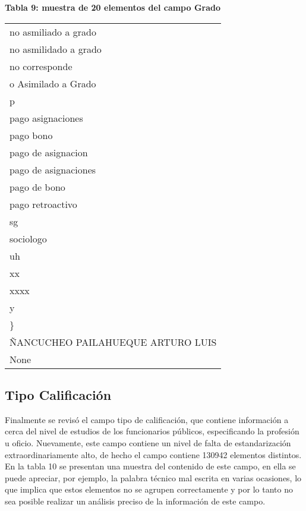 \documentclass[11pt]{article}
\begin{document}
    \textbf{Tabla 9: muestra de 20 elementos del campo Grado}

    
    \begin{tabular}{l}
\toprule
              no asmiliado a grado \\
             no asmilidado a grado \\
                    no corresponde \\
               o Asimilado a Grado \\
                                 p \\
                 pago asignaciones \\
                         pago bono \\
                pago de asignacion \\
              pago de asignaciones \\
                      pago de bono \\
                  pago retroactivo \\
                                sg \\
                         sociologo \\
                                uh \\
                                xx \\
                              xxxx \\
                                 y \\
                                 \} \\
 ÑANCUCHEO PAILAHUEQUE ARTURO LUIS \\
                              None \\
\bottomrule
\end{tabular}

    
    \hypertarget{tipo-calificaciuxf3n}{%
\subsection{Tipo Calificación}\label{tipo-calificaciuxf3n}}

    Finalmente se revisó el campo tipo de calificación, que contiene
información a cerca del nivel de estudios de los funcionarios públicos,
especificando la profesión u oficio. Nuevamente, este campo contiene un
nivel de falta de estandarización extraordinariamente alto, de hecho el
campo contiene 130942 elementos distintos. En la tabla 10 se presentan
una muestra del contenido de este campo, en ella se puede apreciar, por
ejemplo, la palabra técnico mal escrita en varias ocasiones, lo que
implica que estos elementos no se agrupen correctamente y por lo tanto
no sea posible realizar un análisis preciso de la información de este
campo.
\end{document}

